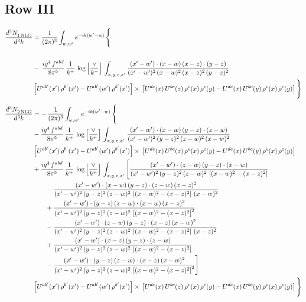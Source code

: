 \documentclass[9pt]{article}
\numberwithin{equation}{section}
\begin{document}
\subsection{Row III}
\begin{align}
   \frac{d^{3}N_{1\,\rm NLO}^{\rm}}{d^{3}k}  & = \frac{1}{(2\pi)^{3}}  \int_{w, w^\prime} e^{-ik(w^\prime-w)}\, \Bigg\{\notag \\ &   \notag \\ & -\,\frac{ig^{4}\,f^{abd}}{8\pi^{5}}\,\frac{1}{k^{+}}\,\log{\left[\frac{\vee}{k^{+}}\right]}\,\int_{x,y,z,x'}\frac{(x'-w')\cdot (x-w)\, (x-z)\cdot (y-z)}{(x'-w')^{2}\, (x-w)^{2}\, (x-z)^{2}\, (y-z)^{2}}\notag \\ & \left[U^{ab'}(x')\,\rho^{b'}(x')-U^{ab'}(w')\, \rho^{b'}(x')\right]\times\, \left[U^{de}(x)\,U^{bc}(z)\, \rho^{e}(x)\,\rho^{c}(y)-U^{de}(x)\,U^{bc}(y)\,\rho^{e}(x)\,\rho^{c}(y)\right]\Bigg\}
\end{align}
\begin{align}
   \frac{d^{3}N_{2\,\rm NLO}^{\rm}}{d^{3}k}  & = -\,\frac{1}{(2\pi)^{3}}  \int_{w, w^\prime} e^{-ik(w^\prime-w)}\, \Bigg\{\notag \\ &  -\frac{ig^{4}\, f^{abd}}{8\pi^{5}}\, \frac{1}{k^{+}}\, \log{\left[\frac{\vee}{ k^{+}}\right]}\,\int_{x,y,z,x'}\,\frac{(x'-w')\cdot (x-w)\, (y-z)\cdot (z-w)}{(x'-w')^{2}\, (y-z)^{2}\, (z-w)^{2}\,(x-w)^{2}}\, \notag \\ & \left[U^{ab'}(x')\,\rho^{b'}(x')-U^{ab'}(w')\, \rho^{b'}(x')\right]\times\,\left[U^{de}(x)\,U^{bc}(z)\, \rho^{e}(x)\,\rho^{c}(y)-U^{de}(x)\,U^{bc}(y)\,\rho^{e}(x)\,\rho^{c}(y)\right]\notag \\ & +\frac{ig^{4}\, f^{abd}}{8\pi^{5}}\, \frac{1}{k^{+}}\,\log{\left[\frac{\vee}{k^{+}}\right]}\,\int_{x,y,z,x'}\Bigg[\frac{(x'-w')\cdot (z-w)\, (y-z)\cdot (x-w)}{(x'-w')^{2}\, (y-z)^{2}\, (z-w)^{2}\,\left[(x-w)^{2}-(x-z)^{2}\right]}\notag \\ & \qquad-\frac{(x'-w')\cdot (x-w)\, (y-z)\cdot (z-w)\,(x-z)^{2}}{(x'-w')^{2}\, (y-z)^{2}\, (z-w)^{2}\,\left[(x-w)^{2}-(x-z)^{2}\right]\,(x-w)^{2}}\notag \\ & \qquad+\frac{(x'-w')\cdot (y-z)\, (z-w)\cdot (x-w)\,(x-z)^{2}}{(x'-w')^{2}\, (y-z)^{2}\, (z-w)^{2}\,\left[(x-w)^{2}-(x-z)^{2}\right]^{2}}\notag \\ & \qquad-\frac{(x'-w')\cdot (z-w)\, (y-z)\cdot (x-z)\,(x-w)^{2}}{(x'-w')^{2}\, (y-z)^{2}\, (z-w)^{2}\,\left[(x-w)^{2}-(x-z)^{2}\right]\,(x-z)^{2}}\notag \\ & \qquad+\frac{(x'-w')\cdot (x-z)\, (y-z)\cdot (z-w)}{(x'-w')^{2}\, (y-z)^{2}\, (z-w)^{2}\,\left[(x-w)^{2}-(x-z)^{2}\right]}\notag \\ & \qquad-\frac{(x'-w')\cdot (y-z)\, (z-w)\cdot (x-z)\,(x-w)^{2}}{(x'-w')^{2}\, (y-z)^{2}\, (z-w)^{2}\,\left[(x-w)^{2}-(x-z)^{2}\right]^{2}}\Bigg]\notag \\ & \left[U^{ab'}(x')\,\rho^{b'}(x')-U^{ab'}(w')\, \rho^{b'}(x')\right]\times\, \left[U^{de}(x)\,U^{bc}(z)\, \rho^{e}(x)\,\rho^{c}(y)-U^{de}(x)\,U^{bc}(y)\,\rho^{e}(x)\,\rho^{c}(y)\right]\Bigg\} 
\end{align}   
\end{document}

